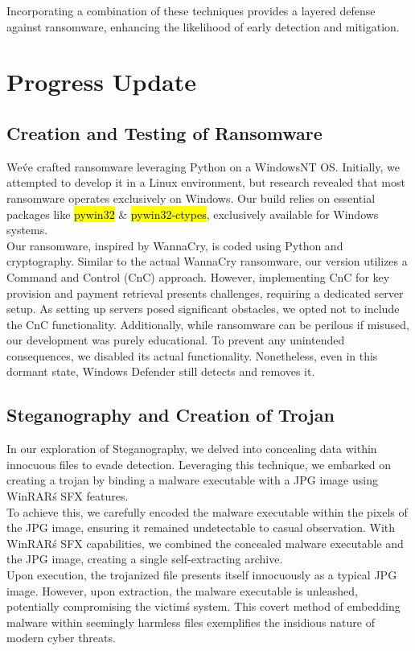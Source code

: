 \documentclass[12pt,twocolumn]{article}
\begin{document}
Incorporating a combination of these techniques provides a layered defense against ransomware, enhancing the likelihood of early detection and mitigation.

%
\section{Progress Update}

\subsection{Creation and Testing of Ransomware}

We\'ve crafted ransomware leveraging Python on a WindowsNT OS. Initially, we attempted to develop it in a Linux environment, but research revealed that most ransomware operates exclusively on Windows. Our build relies on essential packages like \hl{pywin32} \& \hl{pywin32-ctypes}, exclusively available for Windows systems.
\\
Our ransomware, inspired by WannaCry, is coded using Python and cryptography. Similar to the actual WannaCry ransomware, our version utilizes a Command and Control (CnC) approach. However, implementing CnC for key provision and payment retrieval presents challenges, requiring a dedicated server setup. As setting up servers posed significant obstacles, we opted not to include the CnC functionality. Additionally, while ransomware can be perilous if misused, our development was purely educational. To prevent any unintended consequences, we disabled its actual functionality. Nonetheless, even in this dormant state, Windows Defender still detects and removes it.

\subsection{Steganography and Creation of Trojan}

In our exploration of Steganography, we delved into concealing data within innocuous files to evade detection. Leveraging this technique, we embarked on creating a trojan by binding a malware executable with a JPG image using WinRAR\'s SFX features.
\\
To achieve this, we carefully encoded the malware executable within the pixels of the JPG image, ensuring it remained undetectable to casual observation. With WinRAR\'s SFX capabilities, we combined the concealed malware executable and the JPG image, creating a single self-extracting archive.
\\
Upon execution, the trojanized file presents itself innocuously as a typical JPG image. However, upon extraction, the malware executable is unleashed, potentially compromising the victim\'s system. This covert method of embedding malware within seemingly harmless files exemplifies the insidious nature of modern cyber threats.
\end{document}
